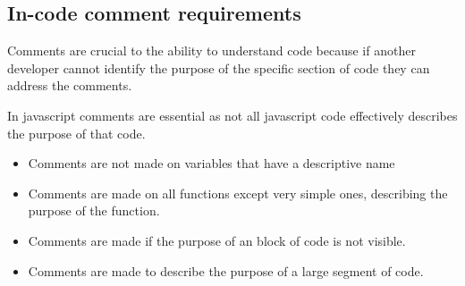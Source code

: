 \documentclass[11pt]{article}
\begin{document}
	\subsection{In-code comment requirements}
	Comments are crucial to the ability to understand code because if another developer cannot identify the purpose of the specific section of code they can address the comments.
	
	In javascript comments are essential as not all javascript code effectively describes the purpose of that code.
	\begin{itemize}
		\item Comments are not made on variables that have a descriptive name
		\item Comments are made on all functions except very simple ones, describing the purpose of the function.
		\item Comments are made if the purpose of an block of code is not visible.
		\item Comments are made to describe the purpose of a large segment of code.
	\end{itemize}
\end{document}

